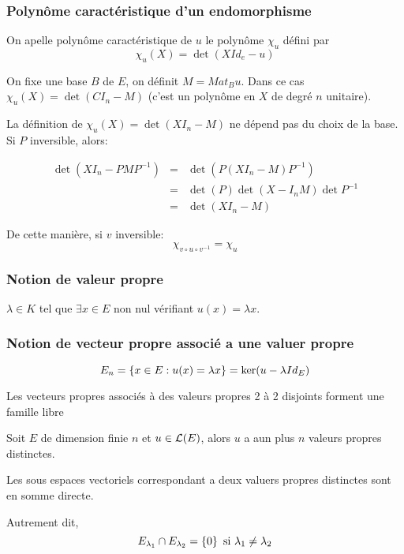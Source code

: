 \subsubsection{Polynôme caractéristique d'un endomorphisme}

On apelle polynôme caractéristique de $u$ le polynôme  $\chi_u$ défini par
$$\chi_u(X) = \det (X Id_e - u)$$

On fixe une base $B$ de $E$, on définit $M = Mat_B u$.
Dans ce cas $\chi_u(X) = \det (CI_n -M)$
(c'est un polynôme en $X$ de degré $n$ unitaire).

La définition de $\chi_u(X) = \det (XI_n-M)$ ne dépend pas du choix de la base.
Si $P$ inversible, alors:


\begin{eqnarray*}
	\det (XI_n - PMP^{-1}) &=& \det (P(XI_n -M) P^{-1})\\
	&=& \det (P) \det (X-I_nM)\det P^{-1}\\
	&=& \det (XI_n -M)
\end{eqnarray*}



De cette manière, si $v$ inversible:
$$ \chi_{v\circ u \circ v^{-1}} = \chi_{u}$$


\subsubsection{Notion de valeur propre}

$\lambda \in K$ tel que $\exists x \in E$ non nul vérifiant $u(x) = \lambda x$.

\subsubsection{Notion de vecteur propre associé a une valuer propre}


$$E_n = \left\{ x \in E: u (x) = \lambda x \right\} = \ker (u - \lambda Id_E) $$

\begin{prop}
	Les vecteurs propres associés à des valeurs propres 2 à 2 disjoints forment une famille libre
\end{prop}

\begin{coro}
	Soit $E$ de dimension finie $n$ et $u \in \mathcal{L}(E)$, alors $u$ a aun plus $n$ valeurs propres distinctes.
\end{coro}


\begin{prop}
	Les sous espaces vectoriels correspondant a deux valuers propres distinctes sont en somme directe.

	Autrement dit,
	$$E_{\lambda_1} \cap E_{\lambda_2} = \left\{0\right\} \text { si } \lambda_1 \neq \lambda_2$$
\end{prop}

